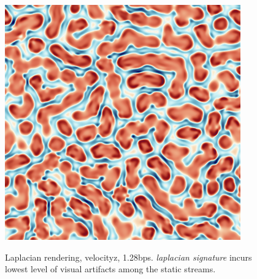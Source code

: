 \begin{figure}[h]
	{\includegraphics[width=0.32\linewidth]{img/laplacian/groundtruth_laplacian_0.png}}
	\caption{Laplacian rendering, velocityz, 1.28bps. \emph{laplacian signature} incurs lowest level of visual artifacts among the static streams.}
	\label{fig:laplacian-precision-comparison}
\end{figure}



